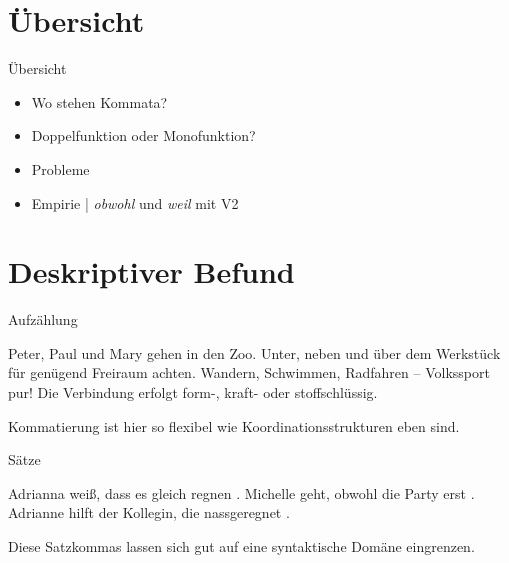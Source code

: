 \section{Übersicht}

\begin{frame}
  {Übersicht}
  \onslide<+->
  \begin{itemize}[<+->]
    \item Wo stehen Kommata?
      \Zeile
    \item Doppelfunktion oder Monofunktion?
    \item Probleme
      \Zeile
    \item Empirie | \textit{obwohl} und \textit{weil} mit V2
  \end{itemize}
\end{frame}

\section[Befund]{Deskriptiver Befund}

\begin{frame}
  {Aufzählung}
  \onslide<+->
  \onslide<+->
  \begin{exe}
    \ex \alert{Peter, Paul und Mary} gehen in den Zoo.
    \ex \alert{Unter, neben und über} dem Werkstück für genügend Freiraum achten.
    \ex \alert{Wandern, Schwimmen, Radfahren} -- Volkssport pur!
    \ex Die Verbindung erfolgt \alert{form-, kraft- oder stoff}schlüssig.
  \end{exe}
  \onslide<+->
  \Zeile
  Kommatierung ist hier so flexibel wie Koordinationsstrukturen eben sind.
\end{frame}

\begin{frame}
  {Sätze}
  \onslide<+->
  \onslide<+->
  \begin{exe}
    \ex
    \begin{xlist}
	  \ex {}
	  \ex {}
    \end{xlist}
    \Zeile
    \ex Adrianna weiß, \alert{dass es gleich regnen} .
    \ex Michelle geht, \alert{obwohl die Party erst} .
    \ex Adrianne hilft der Kollegin, \alert{die nassgeregnet} .
    \Zeile
    \ex {}
  \end{exe}
  \onslide<+->
  \Zeile
  Diese Satzkommas lassen sich gut auf eine syntaktische Domäne eingrenzen.
\end{frame}

